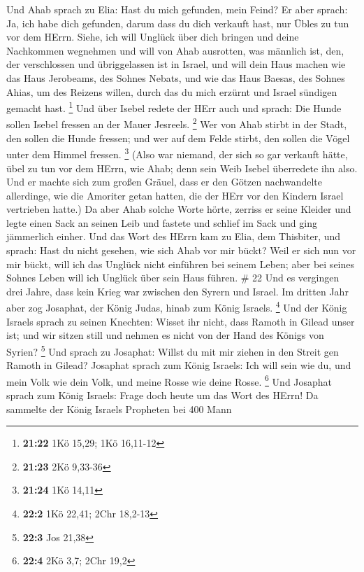  Und Ahab sprach zu Elia: Hast du mich gefunden, mein
Feind? Er aber sprach: Ja, ich habe dich gefunden, darum dass du dich
verkauft hast, nur Übles zu tun vor dem HErrn.  Siehe, ich
will Unglück über dich bringen und deine Nachkommen wegnehmen und will
von Ahab ausrotten, was männlich ist, den, der verschlossen und
übriggelassen ist in Israel,  und will dein Haus machen wie
das Haus Jerobeams, des Sohnes Nebats, und wie das Haus Baesas, des
Sohnes Ahias, um des Reizens willen, durch das du mich erzürnt und
Israel sündigen gemacht hast. \footnote{\textbf{21:22} 1Kö 15,29; 1Kö
  16,11-12}  Und über Isebel redete der HErr auch und
sprach: Die Hunde sollen Isebel fressen an der Mauer Jesreels.
\footnote{\textbf{21:23} 2Kö 9,33-36}  Wer von Ahab stirbt
in der Stadt, den sollen die Hunde fressen; und wer auf dem Felde
stirbt, den sollen die Vögel unter dem Himmel fressen. \footnote{\textbf{21:24}
  1Kö 14,11}  (Also war niemand, der sich so gar verkauft
hätte, übel zu tun vor dem HErrn, wie Ahab; denn sein Weib Isebel
überredete ihn also.  Und er machte sich zum großen Gräuel,
dass er den Götzen nachwandelte allerdinge, wie die Amoriter getan
hatten, die der HErr vor den Kindern Israel vertrieben hatte.)
 Da aber Ahab solche Worte hörte, zerriss er seine Kleider
und legte einen Sack an seinen Leib und fastete und schlief im Sack und
ging jämmerlich einher.  Und das Wort des HErrn kam zu
Elia, dem Thisbiter, und sprach:  Hast du nicht gesehen,
wie sich Ahab vor mir bückt? Weil er sich nun vor mir bückt, will ich
das Unglück nicht einführen bei seinem Leben; aber bei seines Sohnes
Leben will ich Unglück über sein Haus führen. \# 22  Und es
vergingen drei Jahre, dass kein Krieg war zwischen den Syrern und
Israel.  Im dritten Jahr aber zog Josaphat, der König Judas,
hinab zum König Israels. \footnote{\textbf{22:2} 1Kö 22,41; 2Chr 18,2-13}
 Und der König Israels sprach zu seinen Knechten: Wisset ihr
nicht, dass Ramoth in Gilead unser ist; und wir sitzen still und nehmen
es nicht von der Hand des Königs von Syrien? \footnote{\textbf{22:3} Jos
  21,38}  Und sprach zu Josaphat: Willst du mit mir ziehen
in den Streit gen Ramoth in Gilead? Josaphat sprach zum König Israels:
Ich will sein wie du, und mein Volk wie dein Volk, und meine Rosse wie
deine Rosse. \footnote{\textbf{22:4} 2Kö 3,7; 2Chr 19,2} 
Und Josaphat sprach zum König Israels: Frage doch heute um das Wort des
HErrn!  Da sammelte der König Israels Propheten bei 400 Mann
